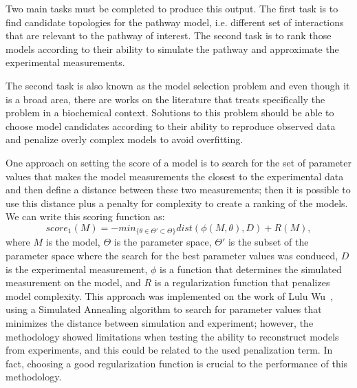 Two main tasks must be completed to produce this output. The first task
is to find candidate topologies for the pathway model, i.e. different
set of interactions that are relevant to the pathway of interest. The
second task is to rank those models according to their ability to 
simulate the pathway and approximate the experimental measurements.


The second task is also known as the model selection problem and even
though it is a broad area, there are works on the literature that treats 
specifically the problem in a biochemical context. Solutions to this 
problem should be able to choose model candidates according to their 
ability to reproduce observed data and penalize overly complex models 
to avoid overfitting. 

One approach on setting the score of a model is to search for the set of 
parameter values that makes the model measurements the closest to the 
experimental data and then define a distance between these two 
measurements; then it is possible to use this distance plus a penalty 
for complexity to create a ranking of the models. We can write this 
scoring function as:
\begin{equation*}
    score_1 (M) = - min_{\{\theta \in \Theta' \subset \Theta\}}  
        dist (\phi(M, \theta), D) + R (M),
\end{equation*}
where $M$ is the model, $\Theta$ is the parameter space, $\Theta'$ is 
the subset of the parameter space where the search for the best 
parameter values was conduced, $D$ is the experimental measurement,
$\phi$ is a function that determines the simulated measurement on the 
model, and $R$ is a regularization function that penalizes model 
complexity. This approach was implemented on the work of Lulu 
Wu~\cite{Wu15}, using a Simulated Annealing algorithm to search for 
parameter values that minimizes the distance between simulation and 
experiment; however, the methodology showed limitations when testing the 
ability to reconstruct models from experiments, and this could be 
related to the used penalization term. In fact, choosing a good 
regularization function is crucial to the performance of this 
methodology.

